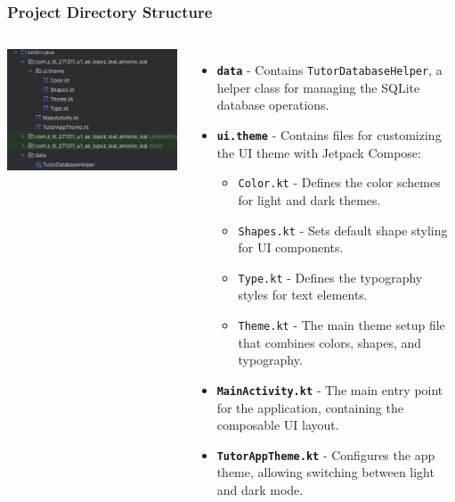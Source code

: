 \documentclass[pdf,
serif,
compress,
xcolor=table,
dvipsnames,
spanish,
aspectratio=169]{beamer}
\begin{document}

\begin{frame}
    \frametitle{Project Directory Structure}

    \begin{columns}
        \centering
        \includegraphics[width=\linewidth]{Directorio.png}

        \begin{itemize}\tiny
            \item \textbf{\texttt{data}} - Contains \texttt{TutorDatabaseHelper}, a helper class for managing the SQLite database operations.
            \item \textbf{\texttt{ui.theme}} - Contains files for customizing the UI theme with Jetpack Compose:
            \begin{itemize} \tiny
                \item \texttt{Color.kt} - Defines the color schemes for light and dark themes.
                \item \texttt{Shapes.kt} - Sets default shape styling for UI components.
                \item \texttt{Type.kt} - Defines the typography styles for text elements.
                \item \texttt{Theme.kt} - The main theme setup file that combines colors, shapes, and typography.
            \end{itemize}
            \item \textbf{\texttt{MainActivity.kt}} - The main entry point for the application, containing the composable UI layout.
            \item \textbf{\texttt{TutorAppTheme.kt}} - Configures the app theme, allowing switching between light and dark mode.
        \end{itemize}
    \end{columns}
\end{frame}
\end{document}
